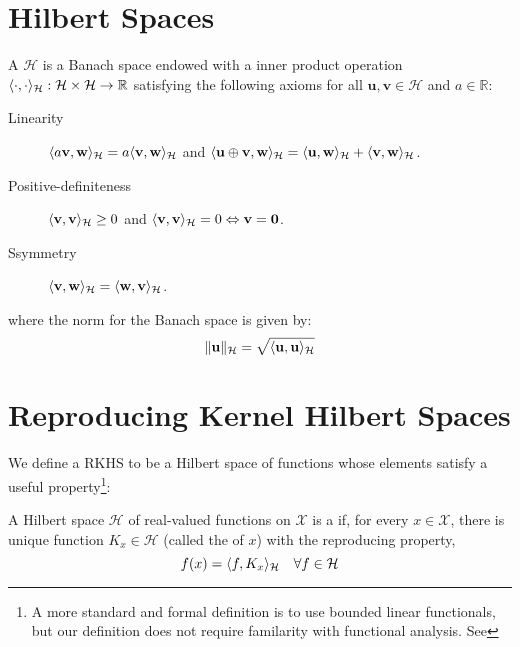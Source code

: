 \section{Hilbert Spaces}

\begin{definition}
A  $\mathcal{H}$ is a Banach space endowed with a inner product operation $\langle\cdot, \cdot\rangle_\mathcal{H} : \mathcal{H} \times \mathcal{H} \to \mathbb{R}$ satisfying the following axioms for all $\mathbf{u}, \mathbf{v} \in \mathcal{H}$ and $a \in \mathbb{R}$:
%
\begin{description}
  \item[Linearity] $\langle a \mathbf{v}, \mathbf{w}\rangle_\mathcal{H} = a \langle\mathbf{v}, \mathbf{w}\rangle_\mathcal{H}$ and $\langle\mathbf{u} \oplus \mathbf{v}, \mathbf{w}\rangle_\mathcal{H} = \langle\mathbf{u}, \mathbf{w}\rangle_\mathcal{H} + \langle\mathbf{v}, \mathbf{w}\rangle_\mathcal{H}$.
  \item[Positive-definiteness] $\langle\mathbf{v}, \mathbf{v}\rangle_\mathcal{H} \geq 0$ and $\langle\mathbf{v}, \mathbf{v}\rangle_\mathcal{H} = 0 \Leftrightarrow \mathbf{v} = \mathbf{0}$.
  \item[Ssymmetry] $\langle\mathbf{v}, \mathbf{w}\rangle_\mathcal{H} = \langle\mathbf{w}, \mathbf{v}\rangle_\mathcal{H}$.
\end{description}
%
where the norm for the Banach space is given by:
%
\begin{equation}
  \lVert\mathbf{u}\rVert_\mathcal{H} = \sqrt{\langle\mathbf{u}, \mathbf{u}\rangle_\mathcal{H}}
\end{equation}
%
\end{definition}

\section{Reproducing Kernel Hilbert Spaces}
We define a RKHS to be a Hilbert space of functions whose elements satisfy a useful property\footnote{A more standard and formal definition is to use bounded linear functionals, but our definition does not require familarity with functional analysis. See }:

\begin{definition}
A Hilbert space $\mathcal{H}$ of real-valued functions on $\mathcal{X}$ is a  if, for every $x \in \mathcal{X}$, there is unique function $K_x \in \mathcal{H}$ (called the  of $x$) with the reproducing property,
\begin{equation}
  f(x) = \langle f, K_x\rangle_\mathcal{H} \quad \forall f \in \mathcal{H}
\end{equation}
\end{definition}

